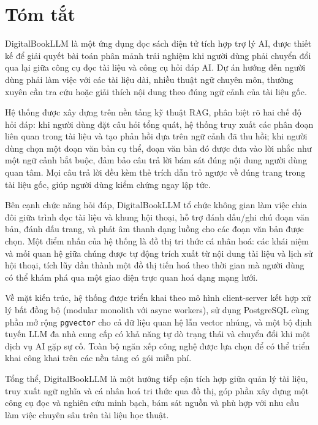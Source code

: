 \chapter*{Tóm tắt}

DigitalBookLLM là một ứng dụng đọc sách điện tử tích hợp trợ lý AI, được thiết kế để giải quyết bài toán phân mảnh trải nghiệm khi người dùng phải chuyển đổi qua lại giữa công cụ đọc tài liệu và công cụ hỏi đáp AI. Dự án hướng đến người dùng phải làm việc với các tài liệu dài, nhiều thuật ngữ chuyên môn, thường xuyên cần tra cứu hoặc giải thích nội dung theo đúng ngữ cảnh của tài liệu gốc.

Hệ thống được xây dựng trên nền tảng kỹ thuật RAG, phân biệt rõ hai chế độ hỏi đáp: khi người dùng đặt câu hỏi tổng quát, hệ thống truy xuất các phân đoạn liên quan trong tài liệu và tạo phản hồi dựa trên ngữ cảnh đã thu hồi; khi người dùng chọn một đoạn văn bản cụ thể, đoạn văn bản đó được đưa vào lời nhắc như một ngữ cảnh bắt buộc, đảm bảo câu trả lời bám sát đúng nội dung người dùng quan tâm. Mọi câu trả lời đều kèm thẻ trích dẫn trỏ ngược về đúng trang trong tài liệu gốc, giúp người dùng kiểm chứng ngay lập tức.

Bên cạnh chức năng hỏi đáp, DigitalBookLLM tổ chức không gian làm việc chia đôi giữa trình đọc tài liệu và khung hội thoại, hỗ trợ đánh dấu/ghi chú đoạn văn bản, đánh dấu trang, và phát âm thanh dạng luồng cho các đoạn văn bản được chọn. Một điểm nhấn của hệ thống là đồ thị tri thức cá nhân hoá: các khái niệm và mối quan hệ giữa chúng được tự động trích xuất từ nội dung tài liệu và lịch sử hội thoại, tích lũy dần thành một đồ thị tiến hoá theo thời gian mà người dùng có thể khám phá qua một giao diện trực quan hoá dạng mạng lưới.

Về mặt kiến trúc, hệ thống được triển khai theo mô hình client-server kết hợp xử lý bất đồng bộ (modular monolith với async workers), sử dụng PostgreSQL cùng phần mở rộng \texttt{pgvector} cho cả dữ liệu quan hệ lẫn vector nhúng, và một bộ định tuyến LLM đa nhà cung cấp có khả năng tự dò trạng thái và chuyển đổi khi một dịch vụ AI gặp sự cố. Toàn bộ ngăn xếp công nghệ được lựa chọn để có thể triển khai công khai trên các nền tảng có gói miễn phí.

Tổng thể, DigitalBookLLM là một hướng tiếp cận tích hợp giữa quản lý tài liệu, truy xuất ngữ nghĩa và cá nhân hoá tri thức qua đồ thị, góp phần xây dựng một công cụ đọc và nghiên cứu minh bạch, bám sát nguồn và phù hợp với nhu cầu làm việc chuyên sâu trên tài liệu học thuật.
